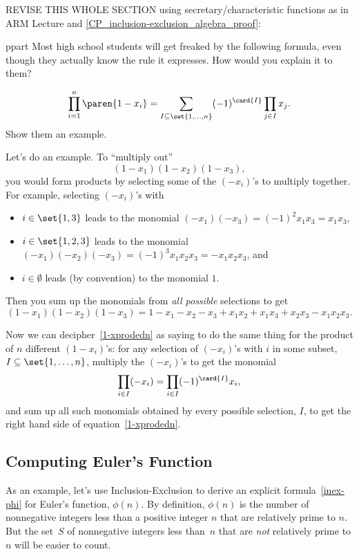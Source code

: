 \begin{editingnotes}
REVISE THIS WHOLE SECTION using secretary/characteristic functions as in ARM
Lecture and \ref{CP_inclusion-exclusion_algebra_proof}:

ppart Most high school students will get freaked by the following formula,
even though they actually know the rule it expresses.  How would you
explain it to them?

\begin{equation}\label{1-xprodedn}
\prod_{i=1}^n \paren{1-x_i} = \sum_{I \subseteq \set{1,\dots,n}} (-1)^{\card{I}}\prod_{j \in I}x_j.
\end{equation}
\hint Show them an example.

\begin{solution}
Let's do an example.  To ``multiply out''
\begin{equation}%
(1-x_1)(1-x_2)(1-x_3),
\end{equation}
you would form \emph{} products by selecting some of the
$(-x_i)$'s to multiply together.  For example, selecting $(-x_i)$'s with
\begin{itemize}
\item $i \in \set{1,3}$ leads to the monomial $(-x_1)(-x_3) = (-1)^2x_1x_3
  = x_1x_3$,
\item $i \in \set{1,2,3}$ leads to the monomial $(-x_1)(-x_2)(-x_3)= (-1)^3x_1x_2x_3 = -x_1x_2x_3$, and
\item $i \in \emptyset$ leads (by convention) to the monomial $1$.
\end{itemize}
Then you sum up the monomials from \emph{all possible} selections to get
\[
(1-x_1)(1-x_2)(1-x_3) = 1 - x_1 - x_2 - x_3 + x_1x_2 + x_1x_3 + x_2x_3 - x_1x_2x_3.
\]

Now we can decipher~\eqref{1-xprodedn} as saying to do the same thing for
the product of $n$ different $(1-x_i)$'s:  for any selection of $(-x_i)$'s
with $i$ in some subset, $I \subseteq \set{1,\dots,n}$, multiply the
$(-x_i)$'s to get the monomial
\[
\prod_{i \in I} (-x_i) = \prod_{i \in I} (-1)^{\card{I}} x_i,
\]
and sum up all such monomials obtained by every possible selection, $I$,
to get the right hand side of equation~\eqref{1-xprodedn}.
\end{solution}

\end{editingnotes}

\subsection{Computing Euler's Function}
As an example, let's use Inclusion-Exclusion to derive an explicit
formula~\eqref{inex-phi} for Euler's function, $\phi(n)$.  By
definition, $\phi(n)$ is the number of nonnegative integers less than
a positive integer $n$ that are relatively prime to $n$.  But the
set~$S$ of nonnegative integers less than~$n$ that are \emph{not}
relatively prime to $n$ will be easier to count.

